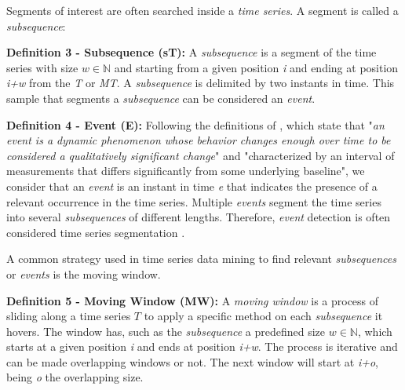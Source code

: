 Segments of interest are often searched inside a \textit{time series}. A segment is called a \textit{subsequence}:
    
    \item \textbf{Definition 3 - Subsequence (sT):} A \textit{subsequence} is a segment of the time series with size $w \in \mathbb{N}$ and starting from a given position \textit{i} and ending at position \textit{i+w} from the \textit{T} or \textit{MT}. A \textit{subsequence} is delimited by two instants in time. This sample that segments a \textit{subsequence} can be considered an \textit{event}.   
    
    \item \textbf{Definition 4 - Event (E):} Following the definitions of \cite{event_def1, event_def2}, which state that "\textit{an event is a dynamic phenomenon whose behavior changes enough over time to be considered a qualitatively significant change}" and "characterized by an interval of measurements that differs significantly from some underlying baseline", we consider that an \textit{event} is an instant in time \textit{e} that indicates the presence of a relevant occurrence in the time series. Multiple \textit{events} segment the time series into several \textit{subsequences} of different lengths. Therefore, \textit{event} detection is often considered time series segmentation \cite{cpd_alan}.
    
A common strategy used in time series data mining to find relevant \textit{subsequences} or \textit{events} is  the moving window. 

    \item \textbf{Definition 5 - Moving Window (MW):} A \textit{moving window} is a process of sliding along a time series $T$ to apply a specific method on each \textit{subsequence} it hovers. The window has, such as the \textit{subsequence} a predefined size $w \in \mathbb{N}$, which starts at a given position \textit{i} and ends at position \textit{i+w}. The process is iterative and can be made overlapping windows or not. The next window will start at \textit{i+o}, being \textit{o} the overlapping size.

